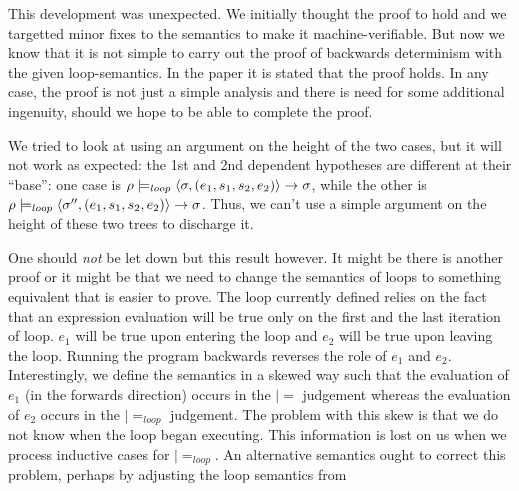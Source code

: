 This development was unexpected. We initially thought the proof to
hold and we targetted minor fixes to the semantics to make it
machine-verifiable. But now we know that it is not simple to carry out
the proof of backwards determinism with the given loop-semantics. In
the paper \cite{yokoyama.axelsen.ea:principles} it is stated that the
proof holds. In any case, the proof is not just a simple analysis and
there is need for some additional ingenuity, should we hope to be able
to complete the proof.

We tried to look at using an argument on the height of the two
cases, but it will not work as expected: the 1st and 2nd dependent
hypotheses are different at their ``base'': one case
is $\rho |=_{loop} \langle \sigma, (e_1, s_1, s_2, e_2) \rangle -> \sigma$,
while the other is $\rho |=_{loop} \langle \sigma'', (e_1, s_1, s_2,
  e_2) \rangle -> \sigma$. Thus, we can't use a simple argument on the height
of these two trees to discharge it.

One should \emph{not} be let down but this result however. It might be
there is another proof or it might be that we need to change the
semantics of loops to something equivalent that is easier to
prove. The loop currently defined relies on the fact that an
expression evaluation will be true only on the first and the last
iteration of loop. $e_1$ will be true upon entering the loop and $e_2$
will be true upon leaving the loop. Running the program backwards
reverses the role of $e_1$ and $e_2$. Interestingly, we define the
semantics in a skewed way such that the evaluation of $e_1$ (in the
forwards direction) occurs in the $|=$ judgement whereas the
evaluation of $e_2$ occurs in the $|=_{loop}$ judgement. The problem
with this skew is that we do not know when the loop began
executing. This information is lost on us when we process inductive
cases for $|=_{loop}$. An alternative semantics ought to correct this
problem, perhaps by adjusting the loop semantics from
\cite{yokoyama.gluck:reversible}


